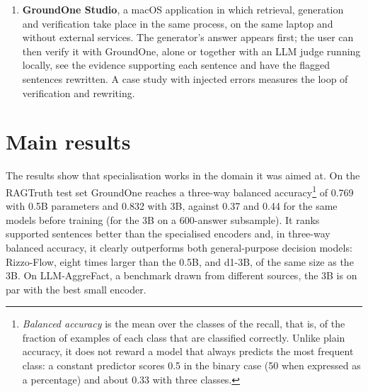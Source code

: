 \begin{enumerate}
measurements to bound, for each class of consumer hardware, what a verifier that generates text must pay and a decision model
does not.
\item \textbf{GroundOne Studio}, a macOS application in which retrieval, generation and verification take place in the
same process, on the same laptop and without external services. The generator's answer appears first; the user can then
verify it with GroundOne, alone or together with an LLM judge running locally, see the evidence supporting each
sentence and have the flagged sentences rewritten. A case study with injected errors measures the loop of verification
and rewriting.
\end{enumerate}

\section{Main results}
\label{sec:intro-results}

The results show that specialisation works in the domain it was aimed at. On the RAGTruth test set GroundOne reaches a
three-way balanced accuracy\footnote{\emph{Balanced accuracy} is the mean over the classes of the recall, that is, of the
fraction of examples of each class that are classified correctly. Unlike plain accuracy, it does not reward a model that
always predicts the most frequent class: a constant predictor scores 0.5 in the binary case (50 when expressed as a
percentage) and about 0.33 with three classes.} of 0.769 with 0.5B parameters and 0.832 with 3B, against 0.37 and 0.44
for the same models before training (for the 3B on a 600-answer subsample). It ranks supported sentences better than the
specialised encoders and, in three-way balanced accuracy, it clearly outperforms both general-purpose decision models: Rizzo-Flow, eight times larger than the 0.5B, and d1-3B, of the same size as the 3B. On LLM-AggreFact, a benchmark drawn from different sources, the 3B is on par with the best small encoder.

